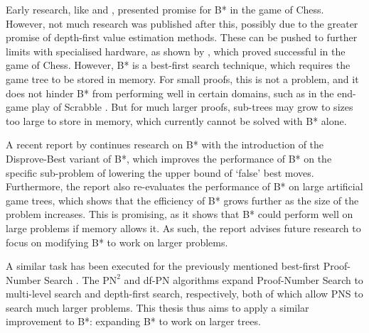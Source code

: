 Early research, like  and , presented promise for B* in the game of Chess. However, not much research was published after this, possibly due to the greater promise of depth-first value estimation methods. These can be pushed to further limits with specialised hardware, as shown by , which proved successful in the game of Chess. However, B* is a best-first search technique, which requires the game tree to be stored in memory. For small proofs, this is not a problem, and it does not hinder B* from performing well in certain domains, such as in the end-game play of Scrabble \cite{Sheppard2002}. But for much larger proofs, sub-trees may grow to sizes too large to store in memory, which currently cannot be solved with B* alone.

A recent report by  continues research on B* with the introduction of the Disprove-Best variant of B*, which improves the performance of B* on the specific sub-problem of lowering the upper bound of `false’ best moves. Furthermore, the report also re-evaluates the performance of B* on large artificial game trees, which shows that the efficiency of B* grows further as the size of the problem increases. This is promising, as it shows that B* could perform well on large problems if memory allows it. As such, the report advises future research to focus on modifying B* to work on larger problems.

A similar task has been executed for the previously mentioned best-first Proof-Number Search \cite{Allis1994}. The ${\text{PN}}^2$ \cite{Breuker1998} and df-PN \cite{Nagai2002} algorithms expand Proof-Number Search to multi-level search and depth-first search, respectively, both of which allow PNS to search much larger problems. This thesis thus aims to apply a similar improvement to B*: expanding B* to work on larger trees.

